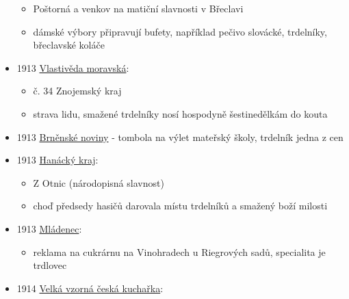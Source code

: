 \begin{itemize}
  \begin{itemize}
  \tightlist
  \item
    Poštorná a venkov na matiční slavnosti v Břeclavi
  \item
    dámské výbory připravují bufety, například pečivo slovácké,
    trdelníky, břeclavské koláče
  \end{itemize}
\item
  1913
  \href{https://ceskadigitalniknihovna.cz/view/uuid:3bc6373e-804a-44b4-b42f-50d5bf37e90d?page=uuid\%3Af7d19e61-5740-11e3-852c-0050569d679d&fulltext=trdelniky&source=mzk}{Vlastivěda
  moravská}:

  \begin{itemize}
  \tightlist
  \item
    č. 34 Znojemský kraj
  \item
    strava lidu, smažené trdelníky nosí hospodyně šestinedělkám do kouta
  \end{itemize}
\item
  1913
  \href{https://ceskadigitalniknihovna.cz/view/uuid:01729a50-78ad-11e3-a388-5ef3fc9ae867?page=uuid\%3A3eefbb60-79ca-11e3-b0d1-005056827e51&fulltext=trdeln\%C3\%ADk\%20OR\%20trdeln\%C3\%ADky\%20OR\%20trdeln\%C3\%ADk\%C5\%AF&source=mzk}{Brněnské
  noviny} - tombola na výlet mateřský školy, trdelník jedna z cen
\item
  1913
  \href{https://www.digitalniknihovna.cz/vkol/uuid/uuid:2997b9af-6b24-4bda-b3cb-6dc7e7e97004}{Hanácký
  kraj}:

  \begin{itemize}
  \tightlist
  \item
    Z Otnic (národopisná slavnost)
  \item
    choď předsedy hasičů darovala místu trdelníků a smažený boží milosti
  \end{itemize}
\item
  1913
  \href{https://ceskadigitalniknihovna.cz/view/uuid:6c6a5e90-917d-11e8-9588-5ef3fc9bb22f?page=uuid\%3A034ac5a0-9a3b-11e8-b814-5ef3fc9bb22f&fulltext=trdlovec&source=nkp}{Mládenec}:

  \begin{itemize}
  \tightlist
  \item
    reklama na cukrárnu na Vinohradech u Riegrových sadů, specialita je
    trdlovec
  \end{itemize}
\item
  1914
  \href{https://www.digitalniknihovna.cz/uzei/uuid/uuid:dcea1ada-9d5a-4be8-a92a-fdab1e9e93e0}{Velká
  vzorná česká kuchařka}:


\end{itemize}
